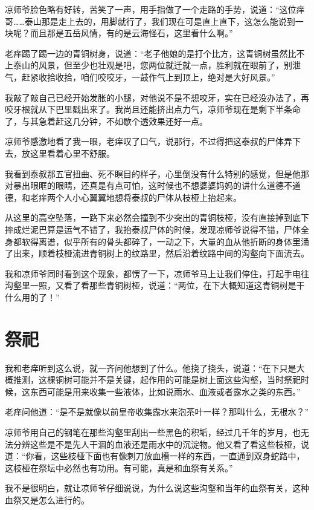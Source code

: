 凉师爷脸色略有好转，苦笑了一声，用手指做了一个走路的手势，说道：“这位痒哥……泰山那是走上去的，用脚就行了，我们现在可是直上直下，这怎么能说到一块呢？而且那是五岳风情，有的是云海怪石，这里看什么啊。”

老痒踢了踢一边的青铜树身，说道：“老子他娘的是打个比方，这青铜树虽然比不上泰山的风景，但至少也壮观是吧，您两位就迁就一点，胜利就在眼前了，别泄气，赶紧收拾收拾，咱们咬咬牙，一鼓作气上到顶上，绝对是大好风景。”

我敲了敲自己已经开始发胀的小腿，对他说不是不想咬牙，实在已经没办法了，再咬牙根就从下巴里戳出来了。我尚且还能挤出点力气，凉师爷现在是剩下半条命了，与其急着赶这几分钟，不如歇个透效果还好一点。

凉师爷感激地看了我一眼，老痒叹了口气，说那行，不过得把这泰叔的尸体弄下去，放这里看着心里不舒服。

我看到泰叔那五官扭曲、死不瞑目的样子，心里倒没有什么特别的感觉，但是他那对暴出眼眶的眼睛，还真是有点可怕，这时候也不想婆婆妈妈的讲什么道德不道德，和老痒两个人小心翼翼地想将泰叔的尸体从枝桠上抬起来。

从这里的高空坠落，一路下来必然会撞到不少突出的青铜枝桠，没有直接掉到底下摔成烂泥巴算是运气不错了，我抬泰叔尸体的时候，发现凉师爷说得不错，尸体全身都软得离谱，似乎所有的骨头都碎了，一动之下，大量的血从他折断的身体里涌了出来，顺着枝桠流进青铜树上的纹路里，然后沿着纹路中间的沟壑向下面流去。

我和凉师爷同时看到这个现象，都愣了一下，凉师爷马上让我们停住，打起手电往沟壑里一照，又看了看那些青铜树桠，说道：“两位，在下大概知道这青铜树是干什么用的了！”

\chapter{祭祀}

我和老痒听到这么说，就一齐问他想到了什么。他挠了挠头，说道：“在下只是大概推测，这棵铜树可能并不是关键，起作用的可能是树上面这些沟壑，当时祭祀时候，这东西可能是用来收集一些液体，比如说雨水、血液或者露水之类的东西。”

老痒问他道：“是不是就像以前皇帝收集露水来泡茶叶一样？那叫什么，无根水？”

凉师爷用自己的钢笔在那些沟壑里刮出一些黑色的积垢，经过几千年的岁月，也无法分辨这些是不是先人干涸的血液还是雨水中的沉淀物。他又看了看这些枝桠，说道：“你看，这些枝桠下面也有像刺刀放血槽一样的东西，一直通到双身蛇路中，这枝桠在祭坛中必然也有功用。有可能，真是和血祭有关系。”

我不是很明白，就让凉师爷仔细说说，为什么说这些沟壑和当年的血祭有关，这种血祭又是怎么进行的。

